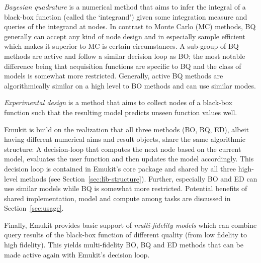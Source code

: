 \emph{Bayesian quadrature}  is a numerical method that aims to infer the integral of a black-box function (called the `integrand') given some integration measure and queries of the integrand at nodes. In contrast to Monte Carlo (MC) methods, BQ generally can accept any kind of node design and in especially sample efficient which makes it superior to MC is certain circumstances.  A sub-group of BQ methods are active and follow a similar decision loop as BO; the most notable difference being that acquisition functions are specific to BQ and the class of models is somewhat more restricted. Generally, active BQ methods are algorithmically similar on a high level to BO methods and can use similar modes.

\emph{Experimental design}  is a method that aims to collect nodes of a black-box function such that the resulting model predicts unseen function values well. 

Emukit is build on the realization that all three methods (BO, BQ, ED), albeit having different numerical aims and result objects, share the same algorithmic structure: A decision-loop that computes the next node based on the current model, evaluates the user function and then updates the model accordingly. This decision loop is contained in Emukit's core package and shared by all three high-level methods (see Section~\ref{sec:lib-structure}).
Further, especially BO and ED can use similar models while BQ is somewhat more restricted. Potential benefits of shared implementation, model and compute among tasks are discussed in Section~\ref{sec:usage}.

Finally, Emukit provides basic support of \emph{multi-fidelity models}  which can combine query results of the black-box function of different quality (from low fidelity to high fidelity). This yields multi-fidelity BO, BQ and ED methods that can be made active again with Emukit's decision loop. 



